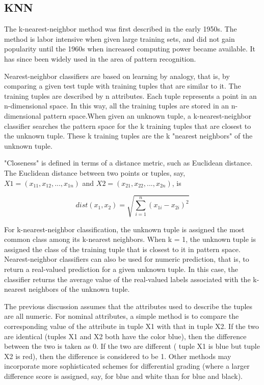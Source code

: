 \subsection{KNN}
The k-nearest-neighbor method \cite{classifications} was first described in the early 1950s. The method is labor intensive when given large training sets, and did not gain popularity until the 1960s when increased computing power became available. It has since been widely used in the area of pattern recognition. \bigskip

Nearest-neighbor classifiers are based on learning by analogy, that is, by comparing a given test tuple with training tuples that are similar to it. The training tuples are described by n attributes. Each tuple represents a point in an n-dimensional space. In this way, all the training tuples are stored in an n-dimensional pattern space.When given an unknown tuple, a k-nearest-neighbor classifier searches the pattern space for the k training tuples that are closest to the unknown tuple. These k training tuples are the k "nearest neighbors" of the unknown tuple.
\bigskip

"Closeness" is defined in terms of a distance metric, such as Euclidean distance. The
Euclidean distance between two points or tuples, say, $X1 =( x_{11}, x_{12},..., x_{1n})$ and $X2=(x_{21}, x_{22},..., x_{2n})$, is

\begin{dBox}
\begin{equation}
dist(x_1, x_2) = \sqrt{\sum_{i=1}^{n}(x_{1i}-x_{2i})^2}
\end{equation}
\end{dBox}


For k-nearest-neighbor classification, the unknown tuple is assigned the most common class among its k-nearest neighbors. When k = 1, the unknown tuple is assigned the class of the training tuple that is closest to it in pattern space. Nearest-neighbor classifiers can also be used for numeric prediction, that is, to return a real-valued prediction
for a given unknown tuple. In this case, the classifier returns the average value of the real-valued labels associated with the k-nearest neighbors of the unknown tuple.\bigskip

The previous discussion assumes that the attributes used
to describe the tuples are all numeric. For nominal attributes, a simple method is to compare the corresponding value of the attribute in tuple X1 with that in tuple X2. If
the two are identical (tuples X1 and X2 both have the color blue), then the difference between the two is taken as 0. If the two are different ( tuple X1 is blue but tuple X2 is red), then the difference is considered to be 1. Other methods may incorporate more sophisticated schemes for differential grading (where a larger difference score is assigned, say, for blue and white than for blue and black).\bigskip

